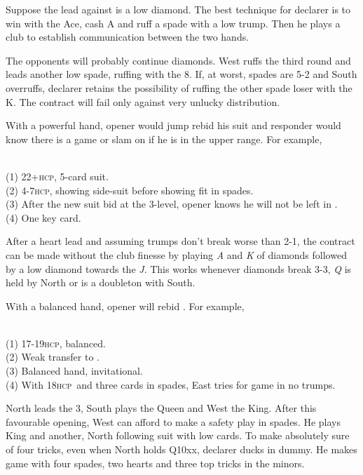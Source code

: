\documentclass[a4paper,article,oneside]{memoir}
\newcommand{\gap}{\vspace{\baselineskip}}
\newcommand{\hcp}{\textsc{hcp}}
\begin{document}
Suppose the lead against  is a low diamond. The best technique
for declarer is to win with the Ace, cash \sp{}A and ruff a spade with
a low trump. Then he plays a club to establish communication between
the two hands.

The opponents will probably continue diamonds. West ruffs the third
round and leads another low spade, ruffing with the \he{}8. If, at
worst, spades are 5-2 and South overruffs, declarer retains the
possibility of ruffing the other spade loser with the \he{}K. The
contract will fail only against very unlucky distribution.

\gap
With a powerful hand, opener would jump rebid his suit and responder
would know there is a game or slam on if he is in the upper range. For
example,

 \\
(1) 22+\hcp, 5-card suit. \\ (2) 4-7\hcp, showing side-suit before
showing fit in spades. \\ (3) After the new suit bid at the 3-level,
opener knows he will not be left in . \\ (4) One key card.

After a heart lead and assuming trumps don't break worse than 2-1, the
contract can be made without the club finesse by playing \emph{A} and
\emph{K} of diamonds followed by a low diamond towards the
\emph{J}. This works whenever diamonds break 3-3, \di{}\emph{Q} is
held by North or is a doubleton with South.

\gap
With a balanced hand, opener will rebid \nt{}. For example,

 \\
(1) 17-19\hcp, balanced. \\ (2) Weak transfer to . \\ (3)
Balanced hand, invitational. \\ (4) With 18\hcp\ and three cards in
spades, East tries for game in no trumps.

North leads the \he{}3, South plays the Queen and West the King. After
this favourable opening, West can afford to make a safety play in
spades. He plays King and another, North following suit with low
cards. To make absolutely sure of four tricks, even when North holds
Q10xx, declarer ducks in dummy. He makes game with four spades, two
hearts and three top tricks in the minors.
\end{document}
